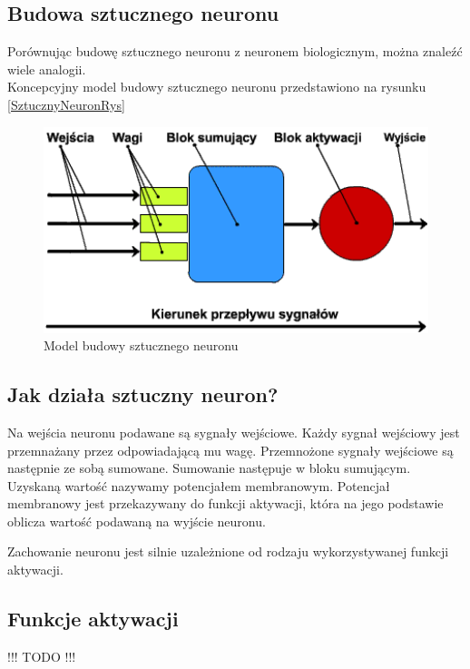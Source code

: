 \newpage
\subsection{Budowa sztucznego neuronu}
Porównując budowę sztucznego neuronu z neuronem biologicznym, można znaleźć wiele analogii. \\
Koncepcyjny model budowy sztucznego neuronu przedstawiono na rysunku \ref{SztucznyNeuronRys}

\vspace{1cm}
\begin{figure}[h]
\begin{center}
\includegraphics[width=15cm]{resources/figures/artificial_neuron.png}
\caption{Model budowy sztucznego neuronu}
\end{center}
\end{figure}
\label{SztucznyNeuronRys}

\subsection{Jak działa sztuczny neuron?}
Na wejścia neuronu podawane są sygnały wejściowe. Każdy sygnał wejściowy
jest przemnażany przez odpowiadającą mu wagę.
Przemnożone sygnały wejściowe są następnie ze sobą sumowane.
Sumowanie następuje w bloku sumującym.
Uzyskaną wartość nazywamy potencjałem membranowym.
Potencjał membranowy jest przekazywany do funkcji aktywacji, która na jego
podstawie oblicza wartość podawaną na wyjście neuronu.

Zachowanie neuronu jest silnie uzależnione od rodzaju wykorzystywanej funkcji
aktywacji.

\subsection{Funkcje aktywacji}
\begin{large}
!!! TODO !!!
\end{large}

